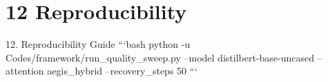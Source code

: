 \section{12 Reproducibility}

 12. Reproducibility Guide
```bash
python -u Codes/framework/run\_quality\_sweep.py --model distilbert-base-uncased --attention aegis\_hybrid --recovery\_steps 50
```
